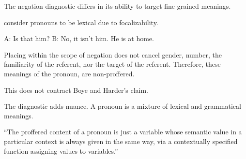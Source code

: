 \documentclass{beamer}
\begin{document}




  



\begin{frame}{The negation diagnostic differs in its ability to target fine grained meanings.}

  \citet{Boye2012} consider pronouns to be lexical due to focalizability.
  
  \pex
  \a A: Is that him?
  \a B: No, it isn't him. He is at home.
  \xe

  Placing  within the scope of negation does not cancel gender, number, the familiarity of the referent, nor the target of the referent.
  Therefore, these meanings of the pronoun, are non-proffered.

\end{frame}

\begin{frame}{This does not contract Boye and Harder's claim.}

  The diagnostic adds nuance.
  A pronoun is a mixture of lexical and grammatical meanings.
  
  \vfill

  ``The proffered content of a pronoun is just a variable whose semantic value in a particular context is always given in the same way, via a contextually specified function assigning values to variables.'' \citep[p.~504]{Roberts2004}
\end{frame}
\end{document}
